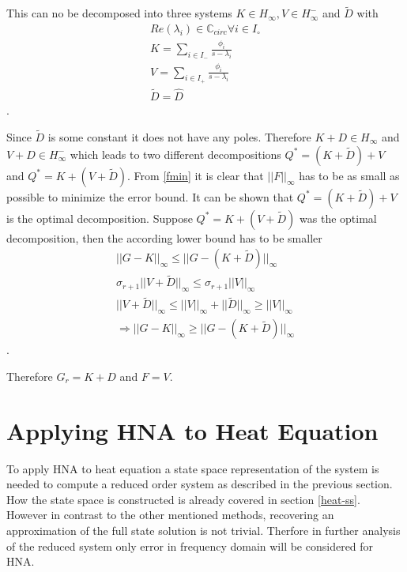This can no be decomposed into three systems \(K \in H_\infty, V \in H_{\infty}^-\) and \(\tilde{D}\) with
\begin{gather}
Re(\lambda_i) \in \mathbb{C}_{circ} \forall i \in I_{\circ} \\
K = \sum_{i \in I_-} \frac{\phi_i}{s-\lambda_i} \\
V = \sum_{i \in I_+} \frac{\phi_i}{s-\lambda_i} \\
\tilde{D} = \hat{D}
\end{gather}
.


Since \(\tilde{D}\) is some constant it does not have any poles.
Therefore \(K + D \in H_\infty\) and \(V + D \in H_{\infty}^-\) which leads to two different decompositions \(Q^{*} = (K + \tilde{D}) + V \) and \(Q^{*} = K + (V + \tilde{D})\).
From \ref{fmin} it is clear that \(||F||_{\infty}\) has to be as small as possible to minimize the error bound.
It can be shown that \(Q^{*} = (K + \tilde{D}) + V \) is the optimal decomposition.
Suppose \(Q^{*} = K + (V + \tilde{D})\) was the optimal decomposition, then the according lower bound has to be smaller
\begin{gather}
||G-K||_{\infty} \leq ||G-(K+\tilde{D})||_{\infty} \\
\sigma_{r+1}||V + \tilde{D}||_{\infty} \leq \sigma_{r+1}||V||_{\infty} \\
||V + \tilde{D}||_{\infty} \leq ||V||_{\infty} + ||\tilde{D}||_{\infty} \geq ||V||_{\infty} \\
\Rightarrow ||G-K||_{\infty} \geq ||G-(K+\tilde{D})||_{\infty}
\end{gather}
.

Therefore \(G_r = K + D\) and \(F = V\).

\section{Applying HNA to Heat Equation}
To apply HNA to heat equation a state space representation of the system is needed to compute a reduced order system as described in the previous section.
How the state space is constructed is already covered in section \ref{heat-ss}.
However in contrast to the other mentioned methods, recovering an approximation of the full state solution is not trivial.
Therfore in further analysis of the reduced system only error in frequency domain will be considered for HNA.
